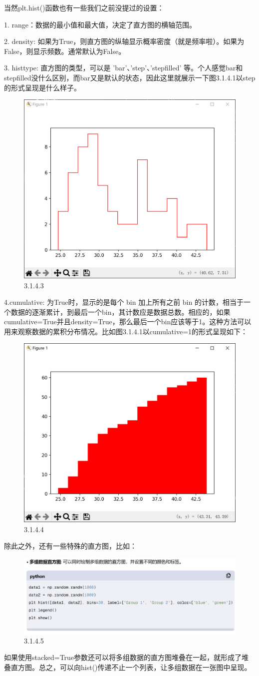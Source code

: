 \documentclass[12pt]{article}
\begin{document}
当然plt.hist()函数也有一些我们之前没提过的设置：

1. range：数据的最小值和最大值，决定了直方图的横轴范围。

2. density: 如果为True，则直方图的纵轴显示概率密度（就是频率啦）。如果为False，则显示频数。通常默认为False。

3. histtype: 直方图的类型，可以是 'bar'、'step'、'stepfilled' 等。个人感觉bar和stepfilled没什么区别，而bar又是默认的状态，因此这里就展示一下图3.1.4.1以step的形式呈现是什么样子。
\begin{figure}[H]
    \centering
    \includegraphics[width=0.5\linewidth]{直方图 Pic2.png}
    \caption{3.1.4.3}
    \label{fig:enter-label}
\end{figure}

4.cumulative: 为True时，显示的是每个 bin 加上所有之前 bin 的计数，相当于一个数据的逐渐累计，到最后一个bin，其计数应是数据总数。相应的，如果cumulative=True并且density=True，那么最后一个bin应该等于1。这种方法可以用来观察数据的累积分布情况。比如图3.1.4.1以cumulative=1的形式呈现如下：
\begin{figure}[H]
    \centering
    \includegraphics[width=0.5\linewidth]{直方图 Pic3.png}
    \caption{3.1.4.4}
    \label{fig:enter-label}
\end{figure}
除此之外，还有一些特殊的直方图，比如：
\begin{figure}[H]
    \centering
    \includegraphics[width=1\linewidth]{直方图 program4.png}
    \caption{3.1.4.5}
    \label{fig:enter-label}
\end{figure}
\noindent 如果使用stacked=True参数还可以将多组数据的直方图堆叠在一起，就形成了堆叠直方图。总之，可以向hist()传递不止一个列表，让多组数据在一张图中呈现。
\end{document}
